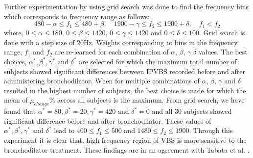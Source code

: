\documentclass{article}
\begin{document}
Further experimentation by using grid search was done to find the frequency bins which corresponds to frequency range as follows:
\begin{equation}
480-\alpha\leq f_1 \leq 480+\beta, \quad 1900-\gamma\leq f_2 \leq 1900+\delta, \quad f_1<f_2
\end{equation}
where, $0\leq\alpha\leq180$, $0\leq\beta\leq1420$, $0\leq\gamma\leq1420$ and  $0\leq\delta\leq100$. Grid search is done with a step size of 20Hz. Weights corresponding to bins in the frequency range, $f_1$ and $f_2$ are re-learned for each combination of \(\alpha\), \(\beta\), \(\gamma\)  \(\delta\) values. The best choices, \(\alpha^*, \beta^*, \gamma^* \text{ and } \delta^*\) are selected for which the maximum total number of subjects showed significant differences between IPVBS recorded before and after administering bronchodilator. When for multiple combinations of $\alpha$, $\beta$, $\gamma$ and $\delta$ resulted in the highest number of subjects, the best choice is made for which the mean of $\mu_{change}$\% across all subjects is the maximum. From grid search, we have found that \(\alpha^*=80, \beta^*=20, \gamma^*=420  \text{ and } \delta^*=0\) and all 30 subjects showed significant difference before and after bronchodilator. These values of \(\alpha^*, \beta^*, \gamma^* \text{ and } \delta^*\) lead to \(400\leq f_1\leq 500\) and \(1480\leq f_2 \leq 1900\). Through this experiment it is clear that, high frequency region of VBS is more sensitive to the bronchodilator treatment. These findings are in an agreement with Tabata et al. \cite{tabata2018changes}.


%
\end{document}
